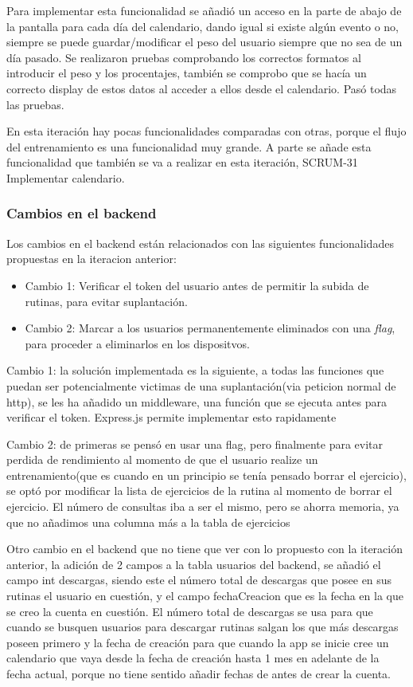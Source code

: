 Para implementar esta funcionalidad se añadió un acceso en la parte de abajo de la pantalla para cada día del calendario, dando igual si existe algún evento o no, siempre se puede guardar/modificar el peso del usuario siempre que no sea de un día pasado. Se realizaron pruebas comprobando los correctos formatos al introducir el peso y los procentajes, también se comprobo que se hacía un correcto display de estos datos al acceder a ellos desde el calendario. Pasó todas las pruebas.

En esta iteración hay pocas funcionalidades comparadas con otras, porque el flujo del entrenamiento es una funcionalidad muy grande. A parte se añade esta funcionalidad que también se va a realizar en esta iteración, SCRUM-31 Implementar calendario.

\subsubsection{Cambios en el backend}

Los cambios en el backend están relacionados con las siguientes funcionalidades propuestas en la iteracion anterior:

\begin{itemize}
	\item Cambio 1: Verificar el token del usuario antes de permitir la subida de rutinas, para evitar suplantación.
  	\item Cambio 2: Marcar a los usuarios permanentemente eliminados con una \textit{flag}, para proceder a eliminarlos en los dispositvos.
\end{itemize}

Cambio 1: la solución implementada es la siguiente, a todas las funciones que puedan ser potencialmente victimas de una suplantación(via peticion normal de http), se les ha añadido un middleware, una función que se ejecuta antes para verificar el token. Express.js permite implementar esto rapidamente

Cambio 2: de primeras se pensó en usar una flag, pero finalmente para evitar perdida de rendimiento al momento de que el usuario realize un entrenamiento(que es cuando en un principio se tenía pensado borrar el ejercicio), se optó por modificar la lista de ejercicios de la rutina al momento de borrar el ejercicio. El número de consultas iba a ser el mismo, pero se ahorra memoria, ya que no añadimos una columna más a la tabla de ejercicios

Otro cambio en el backend que no tiene que ver con lo propuesto con la iteración anterior, la adición de 2 campos a la tabla usuarios del backend, se añadió el campo int descargas, siendo este el número total de descargas que posee en sus rutinas el usuario en cuestión, y el campo fechaCreacion que es la fecha en la que se creo la cuenta en cuestión. El número total de descargas se usa para que cuando se busquen usuarios para descargar rutinas salgan los que más descargas poseen primero y la fecha de creación para que cuando la app se inicie cree un calendario que vaya desde la fecha de creación hasta 1 mes en adelante de la fecha actual, porque no tiene sentido añadir fechas de antes de crear la cuenta.

